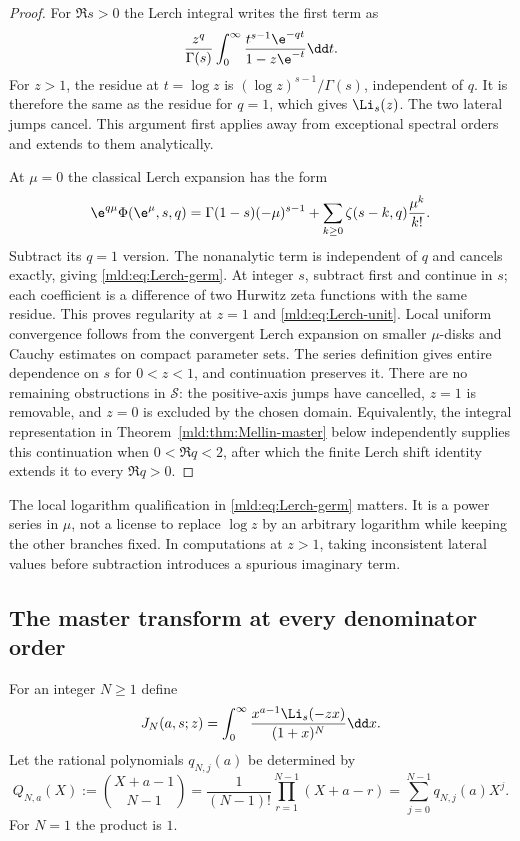 \begin{proof}
For $\Re s>0$ the Lerch integral writes the first term as
\[
 \frac{z^q}{\Gamma(s)}\int_0^\infty
          \frac{t^{s-1}\e^{-qt}}{1-z\e^{-t}}\dd t.
\]
For $z>1$, the residue at $t=\log z$ is
$(\log z)^{s-1}/\Gamma(s)$, independent of $q$. It is therefore the same as the residue for $q=1$, which gives $\Li_s(z)$. The two lateral jumps cancel. This argument first applies away from exceptional spectral orders and extends to them analytically.

At $\mu=0$ the classical Lerch expansion \cite[\S25.14]{DLMFlerch} has the form
\[
 \e^{q\mu}\Phi(\e^\mu,s,q)
 =\Gamma(1-s)(-\mu)^{s-1}
       +\sum_{k\ge0}\zeta(s-k,q)\frac{\mu^k}{k!}.
\]
Subtract its $q=1$ version. The nonanalytic term is independent of $q$ and cancels exactly, giving \eqref{mld:eq:Lerch-germ}. At integer $s$, subtract first and continue in $s$; each coefficient is a difference of two Hurwitz zeta functions with the same residue. This proves regularity at $z=1$ and \eqref{mld:eq:Lerch-unit}. Local uniform convergence follows from the convergent Lerch expansion on smaller $\mu$-disks and Cauchy estimates on compact parameter sets. The series definition gives entire dependence on $s$ for $0<z<1$, and continuation preserves it. There are no remaining obstructions in $\mathcal S$: the positive-axis jumps have cancelled, $z=1$ is removable, and $z=0$ is excluded by the chosen domain. Equivalently, the integral representation in Theorem~\ref{mld:thm:Mellin-master} below independently supplies this continuation when $0<\Re q<2$, after which the finite Lerch shift identity extends it to every $\Re q>0$.
\end{proof}

\begin{remark}
The local logarithm qualification in \eqref{mld:eq:Lerch-germ} matters. It is a power series in $\mu$, not a license to replace $\log z$ by an arbitrary logarithm while keeping the other branches fixed. In computations at $z>1$, taking inconsistent lateral values before subtraction introduces a spurious imaginary term.
\end{remark}

\subsection{The master transform at every denominator order}

For an integer $N\ge1$ define
\begin{equation}\label{mld:eq:JN-definition}
 J_N(a,s;z)=\int_0^\infty
       \frac{x^{a-1}\Li_s(-zx)}{(1+x)^N}\dd x.
\end{equation}
Let the rational polynomials $q_{N,j}(a)$ be determined by
\begin{equation}\label{mld:eq:q-polynomial}
 Q_{N,a}(X):=\binom{X+a-1}{N-1}
 =\frac1{(N-1)!}\prod_{r=1}^{N-1}(X+a-r)
 =\sum_{j=0}^{N-1}q_{N,j}(a)X^j.
\end{equation}
For $N=1$ the product is $1$.

